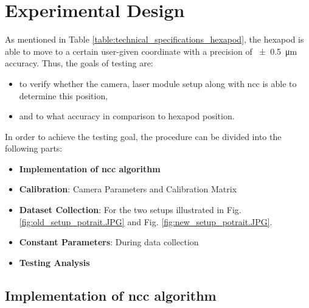 \chapter{Experimental Design}

As mentioned in Table \ref{table:technical_specifications_hexapod}, the hexapod is able to move to a certain user-given coordinate with a precision of \SI{\pm0.5}{\micro\meter} accuracy. Thus, the goals of testing are:
\begin{itemize}
    \item to verify whether the camera, laser module setup along with \gls{ncc} is able to determine this position,
    \item and to what accuracy in comparison to hexapod position.     
\end{itemize}

\vspace{5mm}

\noindent In order to achieve the testing goal, the procedure can be divided into the following parts:

\begin{itemize}
    \item \textbf{Implementation of \gls{ncc} algorithm}
    \item \textbf{Calibration}: Camera Parameters and Calibration Matrix
    \item \textbf{Dataset Collection}: For the two setups illustrated in Fig. \ref{fig:old_setup_potrait.JPG} and Fig. \ref{fig:new_setup_potrait.JPG}.
    \item \textbf{Constant Parameters}: During data collection
    \item \textbf{Testing Analysis}
\end{itemize}


\section{Implementation of \gls{ncc} algorithm}\label{section:code_logic}

